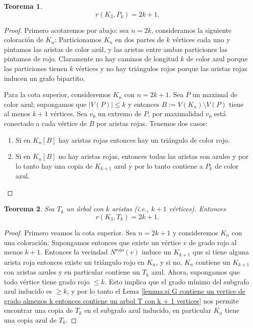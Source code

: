 \documentclass[12pt]{report}
\theoremstyle{plain}
\newtheorem{theorem}{Teorema}[section]
\theoremstyle{definition}
\newcommand{\abs}[1]{\left \vert #1 \right \vert}
\begin{document}
\begin{theorem}
\[
    r(K_3, P_k) = 2k +1.
\]
\end{theorem}
\begin{proof}
Primero acotaremos por abajo: sea $n = 2k$, consideramos la siguiente coloración de $K_n$:
Particionamos $K_n$ en dos partes de $k$ vértices cada uno y pintamos las aristas de color azúl, y las aristas entre ambas particiones las pintamos de rojo. Claramente no hay caminos de longitud $k$ de color azul porque las particiones tienen $k$ vértices y no hay triángulos rojos porque las aristas rojas inducen un grafo bipartito.

Para la cota superior, consideremos $K_n$ con $n = 2k + 1$. Sea $P$ un maximal de color azul; supongamos que $\abs{V (P)} \leq k$ y entonces $B := V(K_n) \setminus V(P)$ tiene al menos $k+1$ vértices. Sea $v_0$ un extremo de $P$, por maximalidad $v_0$ está conectado a cada vértice de $B$ por aristas rojas. Tenemos dos casos:
\begin{enumerate}
\item[\textbf{Caso 1:}] Si en $K_n [B]$ hay aristas rojas entonces hay un triángulo de color rojo.
\item[\textbf{Caso 2:}] Si en $K_n [B]$ no hay aristas rojas, entonces todas las aristas son azules y por lo tanto hay una copia de $K_{k+1}$ azul y por lo tanto contiene a $P_k$ de color azul.
\end{enumerate}
\end{proof}

\begin{theorem}
Sea $T_k$ un árbol con $k$ aristas (i.e., $k+1$ vértices). Entonces
\[
    r(K_3, T_k) = 2k +1.
\]
\end{theorem}
\begin{proof}
Primero veamos la cota superior. Sea $n = 2k + 1$ y consideremos $K_n$ con una coloración. Supongamos entonces que existe un vértice $v$ de grado rojo al menos $k+1$. Entonces la vecindad $N^{\text{rojo}} (v)$ induce un $K_{k+1}$ que si tiene alguna arista roja entonces existe un triángulo rojo en $K_n$, y si no, $K_n$ contiene un $K_{k+1}$ con aristas azules y en particular contiene un $T_k$ azul. Ahora, supongamos que todo vértice tiene grado rojo $\leq k$. Esto implica que el grado mínimo del subgrafo azul inducido es $\geq k$, y por lo tanto el Lema \ref{lemma:si G contiene un vertice de grado almenos k entonces contiene un arbol T con k + 1 vertices} nos permite encontrar una copia de $T_k$ en el subgrafo azul inducido, en particular $K_n$ tiene una copia azul de $T_k$.
\end{proof}
\end{document}
